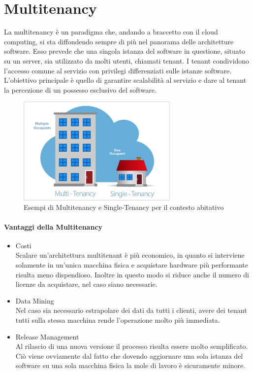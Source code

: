 \section{Multitenancy}
La multitenancy è un paradigma che, andando a braccetto con il cloud computing, si sta diffondendo sempre di più nel panorama delle architetture software. Esso prevede che una singola istanza del software in questione, situato su un server, sia utilizzato da molti utenti, chiamati tenant. I tenant condividono l'accesso comune al servizio con privilegi differenziati sulle istanze software. L'obiettivo principale è quello di garantire scalabilità al servizio e dare al tenant la percezione di un possesso esclusivo del software.
\begin{figure}[h!]
	\centering
	\includegraphics[width=0.7\textwidth,keepaspectratio=true]{capitoli/imgs/multitenancy.png}
	\caption{Esempi di Multitenancy e Single-Tenancy per il contesto abitativo}
\end{figure}

\paragraph{Vantaggi della Multitenancy}
\begin{itemize}
	\item Costi \\
	Scalare un'architettura multitenant è più economico, in quanto si interviene solamente in un'unica macchina fisica e acquistare hardware più performante risulta meno dispendioso. Inoltre in questo modo si riduce anche il numero di licenze da acquistare, nel caso siano necessarie.
	\item Data Mining \\
	Nel caso sia necessario estrapolare dei dati da tutti i clienti, avere dei tenant tutti sulla stessa macchina rende l'operazione molto più immediata.
	\item  Release Management \\
	Al rilascio di una nuova versione il processo risulta essere molto semplificato. Ciò viene ovviamente dal fatto che dovendo aggiornare una sola istanza del software su una sola macchina fisica la mole di lavoro è sicuramente minore.
\end{itemize}

